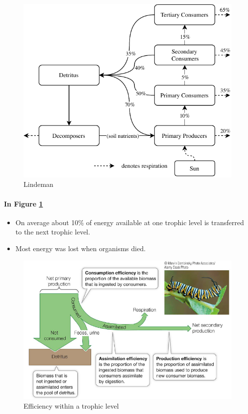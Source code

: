 \documentclass[12pt]{article}
\begin{document}
\begin{figure}[tph]
    \centering
    \includegraphics[width=5in]{lindeman.pdf}
    \caption{Lindeman} \label{lindeman}
\end{figure}

\paragraph{In Figure \ref{lindeman}}
\begin{itemize}
    \item On average about 10\% of energy available at one trophic level is transferred to the next trophic level.
    \item Most energy was lost when organisms died.
\end{itemize}

\begin{figure}[tph]
    \centering
    \includegraphics[width=5in]{trophic-sankey.png}
    \caption{Efficiency within a trophic level} \label{trophic-sankey}
\end{figure}
\end{document}
